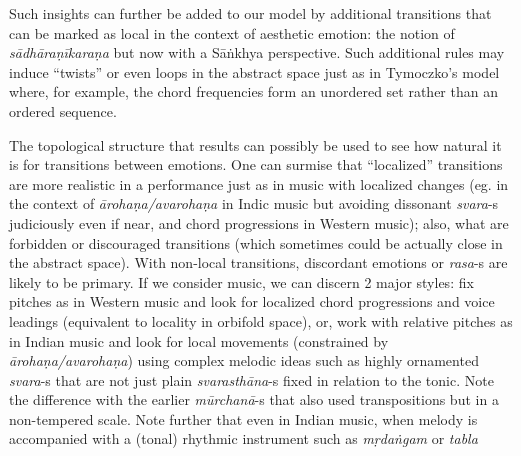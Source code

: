Such insights can further be added to our model by additional transitions that can be marked as local in the context of aesthetic emotion: the notion of \textsl{sādhāraṇīkaraṇa} but now with a Sāṅkhya perspective. Such additional rules may induce “twists” or even loops in the abstract space just as in Tymoczko’s model where, for example, the chord frequencies form an unordered set rather than an ordered sequence.

The topological structure that results can possibly be used to see how natural it is for transitions between emotions. One can surmise that “localized” transitions are more realistic in a performance just as in music with localized changes (eg. in the context of \textsl{ārohaṇa/avarohaṇa} in Indic music but avoiding dissonant \textsl{svara}-s judiciously even if near, and chord progressions in Western music); also, what are forbidden or discouraged transitions (which sometimes could be actually close in the abstract space). With non-local transitions, discordant emotions or \textsl{rasa}-s are likely to be primary. If we consider music, we can discern 2 major styles: fix pitches as in Western music and look for localized chord progressions and voice leadings (equivalent to locality in orbifold space), or, work with relative pitches as in Indian music and look for local movements (constrained by \textsl{ārohaṇa/avarohaṇa}) using complex melodic ideas such as highly ornamented \textsl{svara}-s that are not just plain \textsl{svarasthāna}-s fixed in relation to the tonic. Note the difference with the earlier \textsl{mūrchanā}-s that also used transpositions but in a non-tempered scale. Note further that even in Indian music, when melody is accompanied with a (tonal) rhythmic instrument such as \textsl{mṛdaṅgam} or \textsl{tabla}
